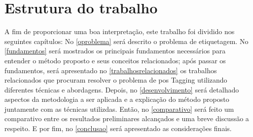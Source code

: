 \section{Estrutura do trabalho}\label{sec:estruturadotrabalho}

A fim de proporcionar uma boa interpretação, este trabalho foi dividido nos seguintes capítulos: No \autoref{oproblema} será descrito o problema de etiquetagem. No \autoref{fundamentos} será mostrados os principais fundamentos necessários para entender o método proposto e seus conceitos relacionados; após passar os fundamentos, será apresentado no \autoref{trabalhosrelacionados} os trabalhos relacionados que procuram resolver o problema de \ac{pos} Tagging utilizando diferentes técnicas e abordagens. Depois, no \autoref{desenvolvimento} será detalhado aspectos da metodologia a ser aplicada e a explicação do método proposto juntamente com as técnicas utilizdas. Então, no \autoref{comparativo} será feito um comparativo entre os resultados preliminares alcançados e uma breve discussão a respeito. E por fim, no \autoref{conclusao} será apresentado as considerações finais.
